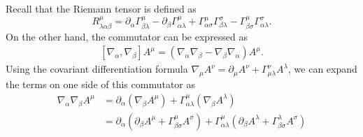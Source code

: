 \documentclass{../../templates/lkx_pset}
\begin{document}
\begin{solution}
	Recall that the Riemann tensor is defined as
	\[
		R^\mu_{\lambda\alpha\beta} = \partial_\alpha\Gamma^\mu_{\beta\lambda} - \partial_\beta\Gamma^\mu_{\alpha\lambda} + \Gamma^\mu_{\alpha\sigma}\Gamma^\sigma_{\beta\lambda} - \Gamma^{\mu}_{\beta\sigma}\Gamma^{\sigma}_{\alpha\lambda}.
	\]
	On the other hand, the commutator can be expressed as
	\[
		\begin{aligned}
			[\nabla_\alpha, \nabla_\beta] A^\mu = (\nabla_\alpha\nabla_\beta - \nabla_\beta\nabla_\alpha) A^\mu.
		\end{aligned}
	\]
	Using the covariant differentiation formula $\nabla_\mu A^\nu = \partial_\mu A^\nu + \Gamma^\nu_{\mu\lambda} A^\lambda$, we can expand the terms on one side of this commutator as
	\[
		\begin{aligned}
			\nabla_\alpha\nabla_\beta A^\mu
			 & = \partial_\alpha(\nabla_\beta A^\mu) + \Gamma^\mu_{\alpha\lambda}(\nabla_\beta A^\lambda)                                                                                                                                                                         \\
			 & = \partial_\alpha(\partial_\beta A^\mu + \Gamma^\mu_{\beta\sigma}A^\sigma)
			+\Gamma^\mu_{\alpha\lambda}(\partial_\beta A^\lambda + \Gamma^\lambda_{\beta\sigma}A^\sigma)                                                                                                                                                                          \\

\end{aligned}\]
\end{solution}
\end{document}
